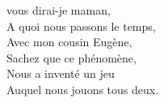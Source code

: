 
 vous dirai-je maman,
\\A quoi nous passons le temps,
\\Avec mon cousin Eugène,
\\Sachez que ce phénomène,
\\Nous a inventé un jeu
\\Auquel nous jouons tous deux.
